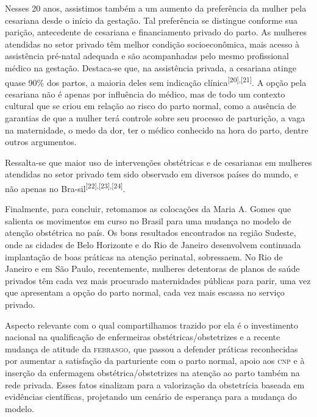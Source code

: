 \documentclass{article}
\begin{document}
Nesses 20 anos, assistimos também a um aumento da preferência da mulher pela
cesariana
desde o início da gestação. Tal preferência se distingue conforme sua parição,
antecedente de cesariana e financiamento privado do parto. As mulheres atendidas
no
setor privado têm melhor condição socioeconômica, mais acesso à assistência
pré-natal
adequada e são acompanhadas pelo mesmo profissional médico na gestação.
Destaca-se que,
na assistência privada, a cesariana atinge quase 90\% dos partos, a maioria
deles sem
indicação clínica\textsuperscript{[}\textsuperscript{20}\textsuperscript{]}\textsuperscript{,}\textsuperscript{[}\textsuperscript{21}\textsuperscript{]}. A opção pela cesariana não é apenas
por influência do médico, mas de todo um contexto cultural que se criou em
relação ao
risco do parto normal, como a ausência de garantias de que a mulher terá
controle sobre
seu processo de parturição, a vaga na maternidade, o medo da dor, ter o médico
conhecido
na hora do parto, dentre outros argumentos.

Ressalta-se que maior uso de intervenções obstétricas e de cesarianas em
mulheres
atendidas no setor privado tem sido observado em diversos países do mundo, e não
apenas
no Bra-sil\textsuperscript{[}\textsuperscript{22}\textsuperscript{]}\textsuperscript{,}\textsuperscript{[}\textsuperscript{23}\textsuperscript{]}\textsuperscript{,}\textsuperscript{[}\textsuperscript{24}\textsuperscript{]}.

Finalmente, para concluir, retomamos as colocações da Maria A. Gomes que
salienta os
movimentos em curso no Brasil para uma mudança no modelo de atenção obstétrica
no país.
Os bons resultados encontrados na região Sudeste, onde as cidades de Belo
Horizonte e do
Rio de Janeiro desenvolvem continuada implantação de boas práticas na atenção
perinatal,
sobressaem. No Rio de Janeiro e em São Paulo, recentemente, mulheres detentoras
de
planos de saúde privados têm cada vez mais procurado maternidades públicas para
parir,
uma vez que apresentam a opção do parto normal, cada vez mais escassa no serviço
privado.

Aspecto relevante com o qual compartilhamos trazido por ela é o investimento
nacional na
qualificação de enfermeiras obstétricas/obstetrizes e a recente mudança de
atitude da
\textsc{febrasgo}, que passou a defender práticas reconhecidas por aumentar a satisfação
da
parturiente com o parto normal, apoio aos \textsc{cnp} e à inserção da enfermagem
obstétrica/obstetrizes na atenção ao parto também na rede privada. Esses fatos
sinalizam
para a valorização da obstetrícia baseada em evidências científicas, projetando
um
cenário de esperança para a mudança do modelo.
\end{document}
